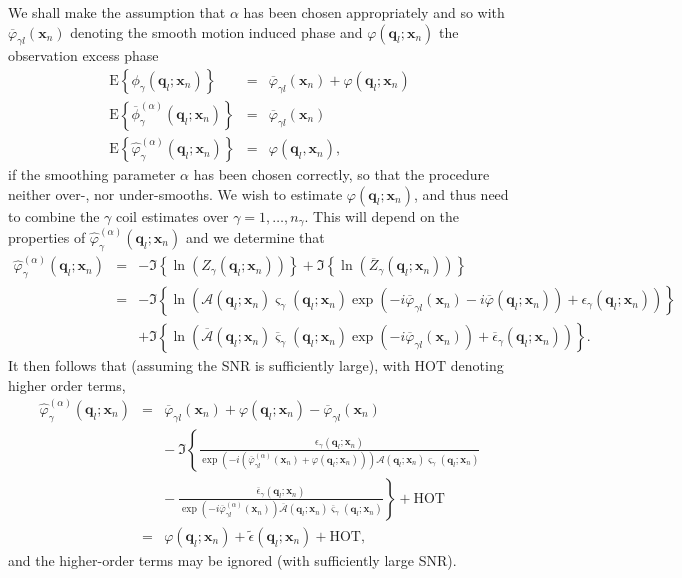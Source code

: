 \documentclass[authoryear,preprint,12pt]{elsarticle}
\newcommand{\HOT}{\text{HOT}}
\newcommand{\E}{\text{E}}
\newcommand{\q}{\mathbf{q}}
\newcommand{\x}{\mathbf{x}}
\newcommand{\cA}{\mathcal{A}}
\newcommand{\eps}{\epsilon}
\newcommand{\ol}[1]{\overline{#1}}
\begin{document}
We shall make the assumption that $\alpha$ has been chosen
appropriately and so with $\ol{\varphi}_{\gamma l}(\x_n)$ denoting the
smooth motion induced phase and $\varphi(\q_l;\x_n)$ the observation
excess phase
\begin{eqnarray}
\E\left\{\phi_{\gamma}(\q_l;\x_n) \right\}&=&\ol{\varphi}_{\gamma l}(\x_n)+\varphi(\q_l;\x_n)\\
\E\left\{\ol{\phi}_{\gamma}^{(\alpha)}(\q_l;\x_n) \right\}&=&\ol{\varphi}_{\gamma l}(\x_n)\\
  \E\left\{\hat{\varphi}_{\gamma}^{(\alpha)}(\q_l;\x_n)\right\} &=&
 \varphi(\q_l,\x_n),
\end{eqnarray}
if the smoothing parameter $\alpha$ has been chosen correctly, so that
the procedure neither over-, nor under-smooths.  We wish to estimate
$\varphi(\q_l;\x_n)$, and thus need to combine the $\gamma$ coil
estimates over $\gamma=1,\dots,n_{\gamma}$.  This will depend on the
properties of $\hat{\varphi}_{\gamma}^{(\alpha)}(\q_l;\x_n)$ and we
determine that
\begin{eqnarray}
  \nonumber
\hat{\varphi}_{\gamma}^{(\alpha)}(\q_l;\x_n) &=&-
  \Im\left\{\ln\left(Z_{\gamma}(\q_l;\x_n)\right)\right\} +
  \Im\left\{\ln\left(\ol{Z}_{\gamma}(\q_l;\x_n)\right)\right\}\\
  \nonumber
  &=& -\Im\left\{\ln\left({\cA}(\q_l;\x_n) \varsigma_{\gamma}(\q_l;\x_n)
  \exp\left(-i\ol{\varphi}_{\gamma l}(\x_n)-i\ol{\varphi}(\q_l;\x_n)\right) +
  \epsilon_{\gamma}(\q_l;\x_n)\right)\right\}\\
  && + \Im\left\{\ln\left(\ol{\cA}(\q_l;\x_n)
  \ol{\varsigma}_{\gamma}(\q_l;\x_n)
  \exp\left(-i\ol{\varphi}_{\gamma l}(\x_n )\right) +
  \ol{\eps}_{\gamma}(\q_l;\x_n)\right)\right\}.
\end{eqnarray}
It then follows that (assuming the SNR is sufficiently large), with
$\HOT$ denoting higher order terms,
\begin{eqnarray}
  \hat\varphi_{\gamma}^{(\alpha)}(\q_l;\x_n) &=&
  \ol{\varphi}_{\gamma l}(\x_n) + \varphi(\q_l;\x_n) -
  \ol{\varphi}_{\gamma l}(\x_n) \nonumber\\
  & & -~ 
  \Im\left\{\frac{\eps_{\gamma}(\q_l;\x_n)}%
  {\exp\left(-i(\ol{\varphi}^{(\alpha)}_{\gamma l}(\x_n) + 
  \varphi(\q_l;\x_n))\right)
  \cA(\q_l;\x_n) \varsigma_{\gamma}(\q_l;\x_n)}\right. \nonumber\\ 
    & & \left.-~ \frac{\ol{\eps}_{\gamma}(\q_l;\x_n)}{\exp\left(-i\ol{\varphi}^{(\alpha)}_{\gamma l}(\x_n)\right){\ol{\cA}}(\q_l;\x_n)\ol{\varsigma}_{\gamma}(\q_l;\x_n)} 
  \right\} + \HOT \nonumber\\
  &=& \varphi(\q_l;\x_n) + \tilde{\eps}(\q_l;\x_n) + \HOT,
\end{eqnarray}
and the higher-order terms may be ignored (with sufficiently large SNR).
\end{document}

